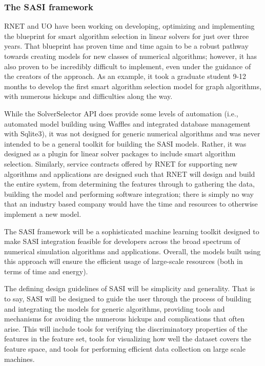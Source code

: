 \subsubsection{The SASI framework} 

RNET and UO have been working on developing, optimizing and implementing the blueprint for smart algorithm selection in linear solvers for just over three years. That blueprint has proven time and time again to be a robust pathway towards creating models for new classes of numerical algorithms; however, it has also proven to be incredibly difficult to implement, even under the guidance of the creators of the approach. As an example, it took a graduate student 9-12 months to develop the first smart algorithm selection model for graph algorithms, with numerous hickups and difficulties along the way. 

While the SolverSelector API does provide some levels of automation (i.e., automated model building using Waffles and integrated database management with Sqlite3), it was not designed for generic numerical algorithms and was never intended to be a general toolkit for building the SASI models. Rather, it was designed as a plugin for linear solver packages to include smart algorithm selection. Similarly, service contracts offered by RNET for supporting new algorithms and applications are designed such that RNET will design and build the entire system, from determining the features through  to gathering the data, building the model and performing software integration; there is simply no way that an industry based company would have the time and resources to otherwise implement a new model. 

The SASI framework will be a sophisticated machine learning toolkit designed to make SASI integration feasible for developers across the broad spectrum of numerical simulation algorithms and applications. Overall, the models built using this approach will ensure the efficient usage of large-scale resources (both in terms of time and energy). 

The defining design guidelines of SASI will be simplicity and generality. That is to say, SASI will be designed to guide the user through the process of building and integrating the models for generic algorithms, providing tools and mechanisms for avoiding the numerous hickups and complications that often arise. This will include tools for verifying the discriminatory properties of the features in the feature set, tools for visualizing how well the dataset covers the feature space, and tools for performing efficient data collection on large scale machines. 

